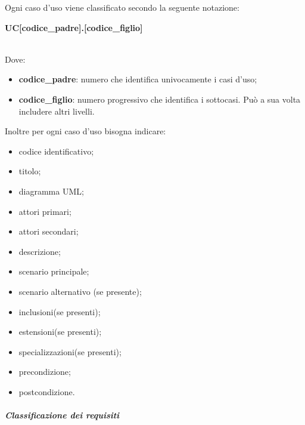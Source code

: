 Ogni caso d'uso viene classificato secondo la seguente notazione: \newline \newline
\centerline{\textbf{UC[codice\_padre].[codice\_figlio]}} \\
Dove:
	\begin{itemize}
		\item \textbf{codice\_padre}: numero che identifica univocamente i casi 
			d'uso;
		\item \textbf{codice\_figlio}: numero progressivo che identifica i 
			sottocasi. Può a sua volta includere altri livelli. \\
	\end{itemize}
Inoltre per ogni caso d'uso bisogna indicare:
	\begin{itemize}
		\item codice identificativo;
		\item titolo;
		\item diagramma UML\glo;
		\item attori primari;
		\item attori secondari;
		\item descrizione;
		\item scenario principale;
		\item scenario alternativo (se presente);
		\item inclusioni(se presenti);
		\item estensioni(se presenti);
		\item specializzazioni(se presenti);
		\item precondizione;
		\item postcondizione. \\
	\end{itemize}


\subparagraph{Classificazione dei requisiti} \mbox{}\\ \label{sec:UC}

